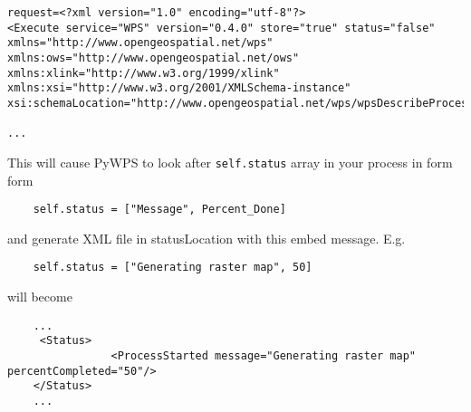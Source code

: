 \documentclass[a4paper,11pt]{article}
\begin{document}
    \begin{verbatim}
request=<?xml version="1.0" encoding="utf-8"?>
<Execute service="WPS" version="0.4.0" store="true" status="false"
xmlns="http://www.opengeospatial.net/wps"
xmlns:ows="http://www.opengeospatial.net/ows"
xmlns:xlink="http://www.w3.org/1999/xlink"
xmlns:xsi="http://www.w3.org/2001/XMLSchema-instance"
xsi:schemaLocation="http://www.opengeospatial.net/wps/wpsDescribeProcess.xsd">

...
    \end{verbatim}

    This will cause PyWPS to look after \texttt{self.status} array in your process in form form 
    \begin{verbatim}
    self.status = ["Message", Percent_Done]
    \end{verbatim}
    and generate XML file in statusLocation with this embed message. E.g.
    \begin{verbatim}
    self.status = ["Generating raster map", 50]
    \end{verbatim}
    will become

    \begin{verbatim}
    ...
     <Status>
                <ProcessStarted message="Generating raster map" percentCompleted="50"/>
    </Status>
    ...
    \end{verbatim}

    \appendix
\end{document}
